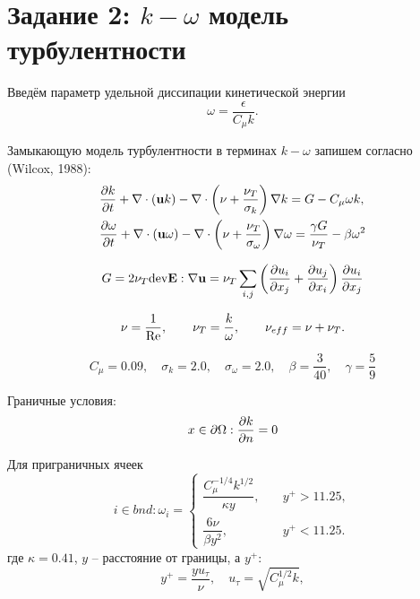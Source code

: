 \section{Задание 2: $k-\omega$ модель турбулентности}

Введём параметр удельной диссипации кинетической энергии
\begin{equation}
\label{eq:turb_omega}
\omega = \frac{\epsilon}{C_\mu k}.
\end{equation}

Замыкающую модель турбулентности в терминах $k-\omega$ запишем согласно (Wilcox, 1988):
\begin{align}
\label{eq:komega}
&\frac{\partial k}{\partial t} + \nabla\cdot(\boldsymbol{\rm u} k) - \nabla \cdot \left(\nu + \frac{\nu_T}{\sigma_k}\right)\nabla k = G - C_\mu \omega k, \\
&\frac{\partial \omega}{\partial t} + \nabla\cdot(\boldsymbol{\rm u} \omega) - \nabla \cdot \left(\nu + \frac{\nu_T}{\sigma_\omega}\right)\nabla \omega = 
	\frac{\gamma G}{\nu_T} - \beta \omega^2
\end{align}

\begin{equation}
G = 2 \nu_T {\rm dev} \boldsymbol{\rm E} : \nabla\boldsymbol{\rm u} = \nu_T \sum_{i,j}\left(\frac{\partial u_i}{\partial x_j} + \frac{\partial u_j}{\partial x_i}\right)\frac{\partial u_i}{\partial x_j}
\end{equation}

\begin{equation}
\nu = \frac{1}{\mathrm{Re}}, \qquad \nu_T = \frac{k}{\omega}, \qquad \nu_{eff} = \nu + \nu_T.
\end{equation}

\begin{equation*}
C_\mu = 0.09, \quad \sigma_k = 2.0, \quad \sigma_\omega = 2.0, \quad \beta = \frac{3}{40}, \quad  \gamma = \frac59
\end{equation*}

Граничные условия:
\begin{equation}
x\in\partial\Omega: \frac{\partial k}{\partial n} = 0
\end{equation}

Для приграничных ячеек
\begin{equation}
i \in bnd: \omega_i = \begin{cases}
\dfrac{C_\mu^{-1/4} k^{1/2}}{\kappa y}, &\quad y^+ > 11.25, \\[10pt]
\dfrac{6 \nu}{\beta y^2},               &\quad y^+ < 11.25.
\end{cases}
\end{equation}
где $\kappa=0.41$, $y$ -- расстояние от границы, а $y^+$:
\begin{equation*}
y^+ = \frac{y u_\tau}{\nu}, \quad u_\tau = \sqrt{C_\mu^{1/2}k},
\end{equation*}

